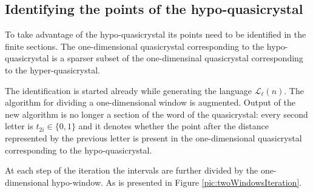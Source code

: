 \documentclass[text.tex]{subfiles}
\begin{document}
\subsection{Identifying the points of the hypo-quasicrystal}
To take advantage of the hypo-quasicrystal its points need to be identified in the finite sections. The one-dimensional quasicrystal corresponding to the hypo-quasicrystal is a sparser subset of the one-dimensinal quasicrystal corresponding to the hyper-quasicrystal. 

The identification is started already while generating the language $\mathcal{L}_\ell(n)$. The algorithm for dividing a one-dimensional window is augmented. Output of the new algorithm is no longer a section of the word of the quasicrystal: every second letter is $t_{2i}\in\{0,1\}$ and it denotes whether the point after the distance represented by the previous letter is present in the one-dimensional quasicrystal corresponding to the hypo-quasicrystal. 

At each step of the iteration the intervals are further divided by the one-dimensional hypo-window. As is presented in Figure \ref{pic:twoWindowsIteration}.
\end{document}
